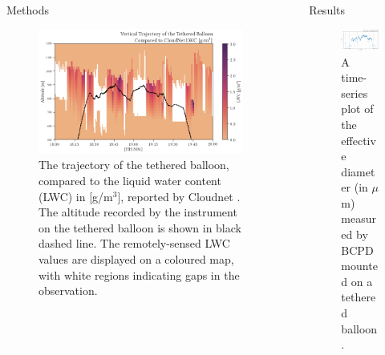 \documentclass[final]{beamer}
\newlength{\sepwidth}
\newlength{\colwidth}
\newcommand{\separatorcolumn}{\begin{column}{\sepwidth}\end{column}}
\begin{document}
\begin{frame}[t]
\begin{columns}[t]
\begin{column}{\colwidth}
\begin{block}{Methods}
        \begin{figure}
          \centering
          \includegraphics[width=\colwidth]{figure/ts_alt.png}
          \caption{The trajectory of the tethered balloon, compared to the liquid water content (LWC) in [g/m$^3$], reported by Cloudnet \cite{illingworth2007cloudnet}. The altitude recorded by the instrument on the tethered balloon is shown in black dashed line. The remotely-sensed LWC values are displayed on a coloured map, with white regions indicating gaps in the observation.}
          \label{fig:02}
        \end{figure}
      \end{block}
    \end{column}

    \separatorcolumn
    \begin{column}{\colwidth}

      \begin{block}{Results}
        \begin{figure}
          \centering
          \includegraphics[width=\colwidth]{figure/ts_ed.png}
          \caption{A time-series plot of the effective diameter (in $\mu$m) measured by BCPD mounted on a tethered balloon.}
          \label{fig:03}
        \end{figure}


\end{block}
\end{column}
\end{columns}
\end{frame}
\end{document}
